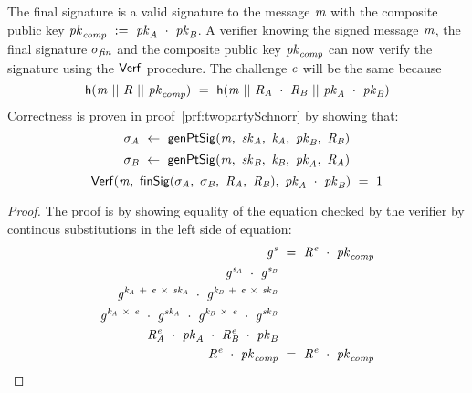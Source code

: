 The final signature is a valid signature to the message $\mathit{m}$ with the composite public key $\mathit{pk}_{\mathit{comp}} ~:=~ \mathit{pk}_{\mathit{A}} ~\cdot~ \mathit{pk}_{\mathit{B}}$.
A verifier knowing the signed message $\mathit{m}$, the final signature $\sigma_{\mathit{fin}}$ and the composite public key $\mathit{pk}_{\mathit{comp}}$ can now verify the signature using the $\mathsf{Verf}$ procedure.
The challenge $\mathit{e}$ will be the same because
\[ \mathsf{h} (\mathit{m} ~||~ \mathit{R} ~||~ \mathit{pk}_{\mathit{comp}}) ~=~ \mathsf{h} (\mathit{m} ~||~ \mathit{R}_{\mathit{A}} ~\cdot~ \mathit{R}_{\mathit{B}} ~||~ \mathit{pk}_{\mathit{A}} ~\cdot~ \mathit{pk}_{\mathit{B}}) \]
Correctness is proven in proof~\ref{prf:twopartySchnorr} by showing
that:~
\[ \sigma_{\mathit{A}} ~\leftarrow~ \mathsf{genPtSig}(\mathit{m} ,~ \mathit{sk}_{\mathit{A}} ,~ \mathit{\mathit{k}_{\mathit{A}}} ,~ \mathit{pk}_{\mathit{B}} ,~ \mathit{R}_{\mathit{B}}) \]
\[ \sigma_{\mathit{B}} ~\leftarrow~ \mathsf{genPtSig}(\mathit{m} ,~ \mathit{sk}_{\mathit{B}} ,~ \mathit{\mathit{k}_{\mathit{B}}} ,~ \mathit{pk}_{\mathit{A}} ,~ \mathit{R}_{\mathit{A}}) \]
\[ \mathsf{Verf}(\mathit{m} ,~ \mathsf{finSig}(\sigma_{\mathit{A}} ,~ \sigma_{\mathit{B}} ,~ \mathit{R}_{\mathit{A}} ,~ \mathit{R}_{\mathit{B}}) ,~ \mathit{pk}_{\mathit{A}} ~\cdot~ \mathit{pk}_{\mathit{B}}) ~=~ 1 \]

\begin{proof} \label{prf:twopartySchnorr}
    The proof is by showing equality of the equation checked by the verifier by continous substitutions in the left side of equation:
    \begin{align}
        \mathit{g}^{\mathit{s}} &~=~ \mathit{R}^{\mathit{e}} ~\cdot~ \mathit{pk}_{\mathit{comp}} \\
        \mathit{g}^{\mathit{s}_{\mathit{A}}} ~\cdot~ \mathit{g}^{\mathit{s}_{\mathit{B}}} & \\
        \mathit{g}^{\mathit{\mathit{k}_{\mathit{A}}} ~+~ \mathit{e} ~\times~ \mathit{sk}_{\mathit{A}}} ~\cdot~ \mathit{g}^{\mathit{\mathit{k}_{\mathit{B}}} ~+~ \mathit{e} ~\times~ \mathit{sk}_{\mathit{B}}} & \\
        \mathit{g}^{\mathit{\mathit{k}_{\mathit{A}}} ~\times~ \mathit{e}} ~\cdot~ \mathit{g}^{\mathit{sk}_{\mathit{A}}} ~\cdot~ \mathit{g}^{\mathit{\mathit{k}_{\mathit{B}}} ~\times~ \mathit{e}} ~\cdot~ \mathit{g}^{\mathit{sk}_{\mathit{B}}} & \\
        \mathit{R}_{\mathit{A}}^{\mathit{e}} ~\cdot~ \mathit{pk}_{\mathit{A}} ~\cdot~ \mathit{R}_{\mathit{B}}^{\mathit{e}} ~\cdot~ \mathit{pk}_{\mathit{B}} & \\
        \mathit{R}^{\mathit{e}} ~\cdot~ \mathit{pk}_{\mathit{comp}} & ~=~ \mathit{R}^{\mathit{e}} ~\cdot~ \mathit{pk}_{\mathit{comp}}
    \end{align}
\end{proof}

